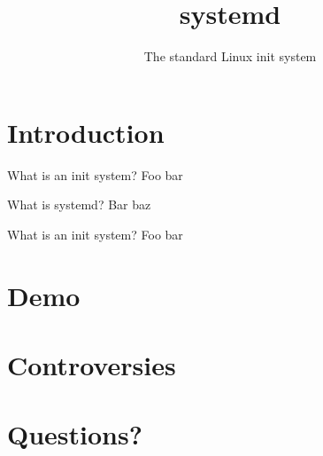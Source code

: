 \documentclass[14pt]{beamer}
\title{systemd}
\subtitle{The standard Linux init system}
\begin{document}

\maketitle

\section{Introduction}

\begin{frame}{What is an init system?}
  Foo bar
\end{frame}

\begin{frame}{What is systemd?}
  Bar baz
\end{frame}

\begin{frame}{What is an init system?}
  Foo bar
\end{frame}

\section{Demo}

\section{Controversies}

\section{Questions?}
\end{document}
